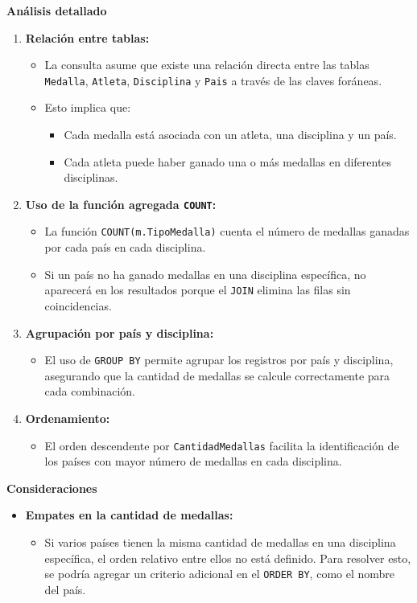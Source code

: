 \textbf{Análisis detallado}

\begin{enumerate}
   \item \textbf{Relación entre tablas:}
   \begin{itemize}
       \item La consulta asume que existe una relación directa entre las tablas \texttt{Medalla}, \texttt{Atleta}, \texttt{Disciplina} y \texttt{Pais} a través de las claves foráneas.
       \item Esto implica que:
       \begin{itemize}
           \item Cada medalla está asociada con un atleta, una disciplina y un país.
           \item Cada atleta puede haber ganado una o más medallas en diferentes disciplinas.
       \end{itemize}
   \end{itemize}
   
   \item \textbf{Uso de la función agregada \texttt{COUNT}:}
   \begin{itemize}
       \item La función \texttt{COUNT(m.TipoMedalla)} cuenta el número de medallas ganadas por cada país en cada disciplina.
       \item Si un país no ha ganado medallas en una disciplina específica, no aparecerá en los resultados porque el \texttt{JOIN} elimina las filas sin coincidencias.
   \end{itemize}
   
   \item \textbf{Agrupación por país y disciplina:}
   \begin{itemize}
       \item El uso de \texttt{GROUP BY} permite agrupar los registros por país y disciplina, asegurando que la cantidad de medallas se calcule correctamente para cada combinación.
   \end{itemize}
   
   \item \textbf{Ordenamiento:}
   \begin{itemize}
       \item El orden descendente por \texttt{CantidadMedallas} facilita la identificación de los países con mayor número de medallas en cada disciplina.
   \end{itemize}
\end{enumerate}

\textbf{Consideraciones}

\begin{itemize}
   \item \textbf{Empates en la cantidad de medallas:}
   \begin{itemize}
       \item Si varios países tienen la misma cantidad de medallas en una disciplina específica, el orden relativo entre ellos no está definido. Para resolver esto, se podría agregar un criterio adicional en el \texttt{ORDER BY}, como el nombre del país.
   \end{itemize}
\end{itemize}
